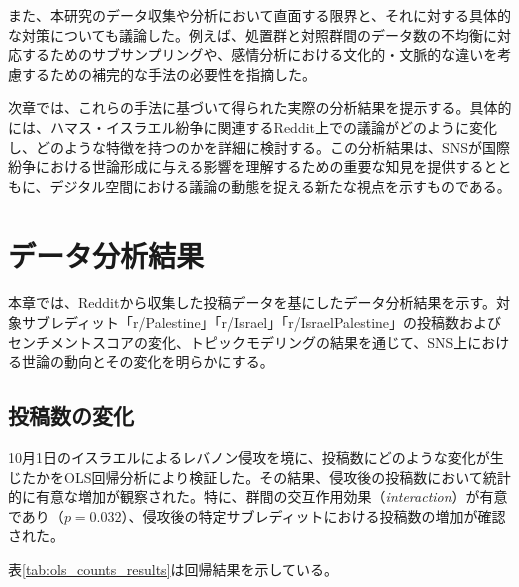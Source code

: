 \documentclass[11pt, a4j]{jreport}
\begin{document}
    また、本研究のデータ収集や分析において直面する限界と、それに対する具体的な対策についても議論した。例えば、処置群と対照群間のデータ数の不均衡に対応するためのサブサンプリングや、感情分析における文化的・文脈的な違いを考慮するための補完的な手法の必要性を指摘した。

    次章では、これらの手法に基づいて得られた実際の分析結果を提示する。具体的には、ハマス・イスラエル紛争に関連するReddit上での議論がどのように変化し、どのような特徴を持つのかを詳細に検討する。この分析結果は、SNSが国際紛争における世論形成に与える影響を理解するための重要な知見を提供するとともに、デジタル空間における議論の動態を捉える新たな視点を示すものである。

    \chapter{データ分析結果}
    本章では、Redditから収集した投稿データを基にしたデータ分析結果を示す。対象サブレディット「r/Palestine」「r/Israel」「r/IsraelPalestine」の投稿数およびセンチメントスコアの変化、トピックモデリングの結果を通じて、SNS上における世論の動向とその変化を明らかにする。

    \section{投稿数の変化}
    10月1日のイスラエルによるレバノン侵攻を境に、投稿数にどのような変化が生じたかをOLS回帰分析により検証した。その結果、侵攻後の投稿数において統計的に有意な増加が観察された。特に、群間の交互作用効果（\textit{interaction}）が有意であり（$p = 0.032$）、侵攻後の特定サブレディットにおける投稿数の増加が確認された。

    表\ref{tab:ols_counts_results}は回帰結果を示している。

    \begin{table}[H]
        \centering
        \caption{投稿数の変化に関するOLS回帰結果}
        \label{tab:ols_counts_results}
    \end{table}
\end{document}
